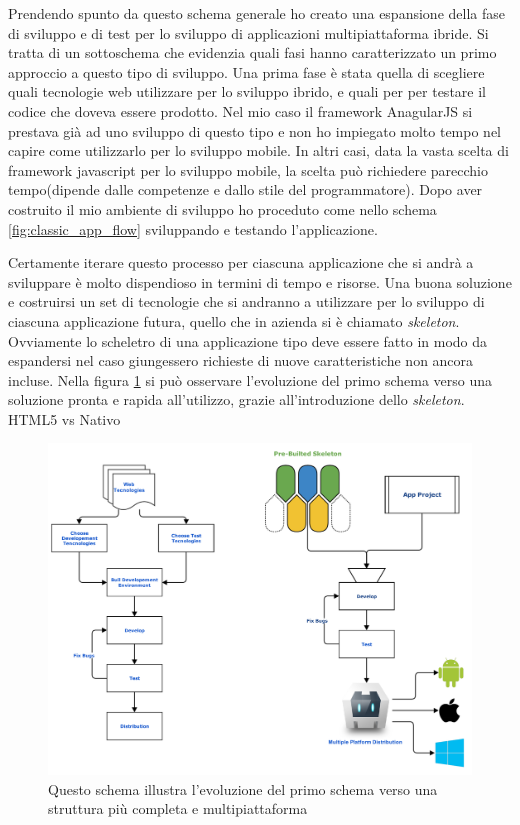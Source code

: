 Prendendo spunto da questo schema generale ho creato una espansione della fase di sviluppo e di test per lo sviluppo di applicazioni multipiattaforma ibride. Si tratta di un sottoschema che evidenzia quali fasi hanno caratterizzato un primo approccio a questo tipo di sviluppo.
Una prima fase è stata quella di scegliere quali tecnologie web utilizzare per lo sviluppo ibrido, e quali per per testare il codice che doveva essere prodotto. Nel mio caso il framework AnagularJS si prestava già ad uno sviluppo di questo tipo e non ho impiegato molto tempo nel capire come utilizzarlo per lo sviluppo mobile. In altri casi, data la vasta scelta di framework javascript per lo sviluppo mobile, la scelta può richiedere parecchio tempo(dipende dalle competenze e dallo stile del programmatore).
Dopo aver costruito il mio ambiente di sviluppo ho proceduto come nello schema \ref{fig:classic_app_flow} sviluppando e testando l'applicazione.

Certamente iterare questo processo per ciascuna applicazione che si andrà a sviluppare è molto dispendioso in termini di tempo e risorse. Una buona soluzione e costruirsi un set di tecnologie che si andranno a utilizzare per lo sviluppo di ciascuna applicazione futura, quello che in azienda si è chiamato \emph{skeleton}. Ovviamente lo scheletro di una applicazione tipo deve essere fatto in modo da espandersi nel caso giungessero richieste di nuove caratteristiche non ancora incluse. Nella figura \ref{fig:flow_match} si può osservare l'evoluzione del primo schema verso una soluzione pronta e rapida all'utilizzo, grazie all'introduzione dello \emph{skeleton}.
HTML5 vs Nativo

\begin{figure}
	\begin{center}
		\includegraphics[scale=0.5]{Figures/match_flow.pdf}
		\caption[Schemi di sviluppo a confronto]{Questo schema illustra l'evoluzione del primo schema verso una struttura più completa e multipiattaforma}
		\label{fig:flow_match}
	\end{center}
\end{figure}

